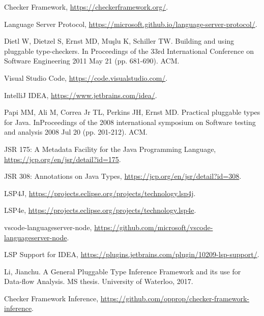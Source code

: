 \documentclass{article}
\begin{document}
\begin{thebibliography}{1}

 Checker Framework, \url{https://checkerframework.org/}.

 Language Server Protocol,
  \url{https://microsoft.github.io/language-server-protocol/}.

 Dietl W, Dietzel S, Ernst MD, Muşlu K, Schiller TW. Building
  and using pluggable type-checkers. In Proceedings of the 33rd International
  Conference on Software Engineering 2011 May 21 (pp. 681-690). ACM.

 Visual Studio Code, \url{https://code.visualstudio.com/}.

 IntelliJ IDEA, \url{https://www.jetbrains.com/idea/}.

 Papi MM, Ali M, Correa Jr TL, Perkins JH, Ernst MD. Practical
  pluggable types for Java. InProceedings of the 2008 international symposium on
  Software testing and analysis 2008 Jul 20 (pp. 201-212). ACM.

 JSR 175: A Metadata Facility for the Java Programming Language,
  \url{https://jcp.org/en/jsr/detail?id=175}.

 JSR 308: Annotations on Java Types,
  \url{https://jcp.org/en/jsr/detail?id=308}.

 LSP4J,
  \url{https://projects.eclipse.org/projects/technology.lsp4j}.

 LSP4e,
  \url{https://projects.eclipse.org/projects/technology.lsp4e}.

 vscode-languageserver-node,
  \url{https://github.com/microsoft/vscode-languageserver-node}.

 LSP Support for IDEA,
  \url{https://plugins.jetbrains.com/plugin/10209-lsp-support/}.

 Li, Jianchu. A General Pluggable Type Inference Framework and its
  use for Data-flow Analysis. MS thesis. University of Waterloo, 2017.

 Checker Framework Inference,
  \url{https://github.com/opprop/checker-framework-inference}.

\end{thebibliography}
\end{document}
